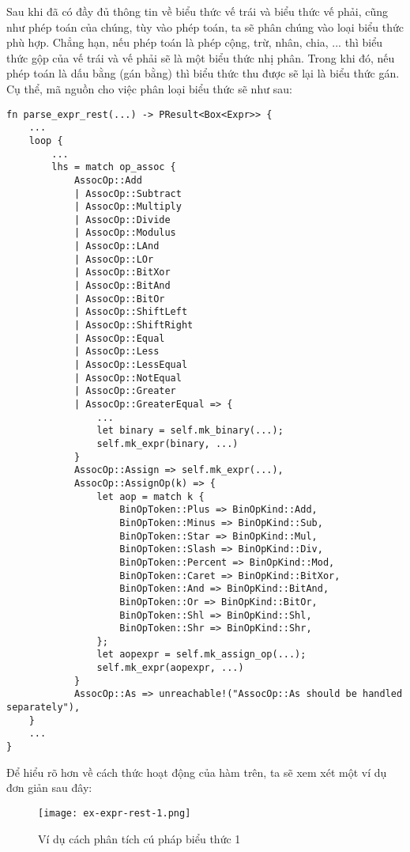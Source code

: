     Sau khi đã có đầy đủ thông tin về biểu thức vế trái và biểu thức vế phải, cũng như phép toán của chúng, tùy vào phép toán, ta sẽ phân chúng vào loại biểu thức phù hợp. Chẳng hạn, nếu phép toán là phép cộng, trừ, nhân, chia, ... thì biểu thức gộp của vế trái và vế phải sẽ là một biểu thức nhị phân. Trong khi đó, nếu phép toán là dấu bằng (gán bằng) thì biểu thức thu được sẽ lại là biểu thức gán. Cụ thể, mã nguồn cho việc phân loại biểu thức sẽ như sau:

\begin{lstlisting}[]
fn parse_expr_rest(...) -> PResult<Box<Expr>> {
    ...
    loop {
        ...
        lhs = match op_assoc {
            AssocOp::Add
            | AssocOp::Subtract
            | AssocOp::Multiply
            | AssocOp::Divide
            | AssocOp::Modulus
            | AssocOp::LAnd
            | AssocOp::LOr
            | AssocOp::BitXor
            | AssocOp::BitAnd
            | AssocOp::BitOr
            | AssocOp::ShiftLeft
            | AssocOp::ShiftRight
            | AssocOp::Equal
            | AssocOp::Less
            | AssocOp::LessEqual
            | AssocOp::NotEqual
            | AssocOp::Greater
            | AssocOp::GreaterEqual => {
                ...
                let binary = self.mk_binary(...);
                self.mk_expr(binary, ...)
            }
            AssocOp::Assign => self.mk_expr(...),
            AssocOp::AssignOp(k) => {
                let aop = match k {
                    BinOpToken::Plus => BinOpKind::Add,
                    BinOpToken::Minus => BinOpKind::Sub,
                    BinOpToken::Star => BinOpKind::Mul,
                    BinOpToken::Slash => BinOpKind::Div,
                    BinOpToken::Percent => BinOpKind::Mod,
                    BinOpToken::Caret => BinOpKind::BitXor,
                    BinOpToken::And => BinOpKind::BitAnd,
                    BinOpToken::Or => BinOpKind::BitOr,
                    BinOpToken::Shl => BinOpKind::Shl,
                    BinOpToken::Shr => BinOpKind::Shr,
                };
                let aopexpr = self.mk_assign_op(...);
                self.mk_expr(aopexpr, ...)
            }
            AssocOp::As => unreachable!("AssocOp::As should be handled separately"),
    }
    ...
}
\end{lstlisting}

    Để hiểu rõ hơn về cách thức hoạt động của hàm trên, ta sẽ xem xét một ví dụ đơn giản sau đây:

\begin{figure}[H]
    \centering
    \texttt{[image: ex-expr-rest-1.png]}
    \caption{Ví dụ cách phân tích cú pháp biểu thức 1}
\end{figure}

